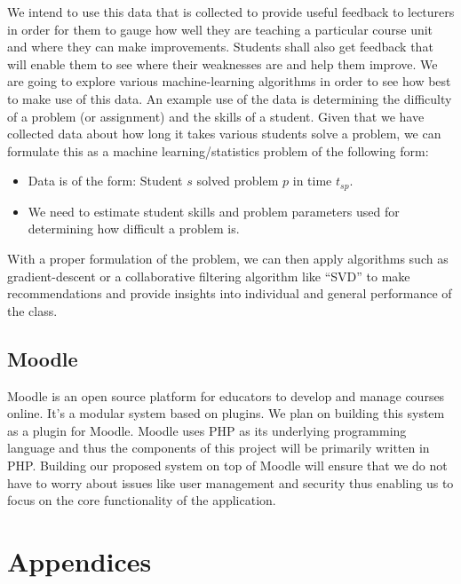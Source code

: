 \documentclass[12pt]{article}
\begin{document}
	We intend to use this data that is collected to provide useful feedback to lecturers in order for them to gauge how well they are teaching a particular course unit and where they can make improvements. Students shall also get feedback that will enable them to see where their weaknesses are and help	them improve. We are going to explore various machine-learning algorithms in order to see how best to make use of this data. An example use of the data is determining the difficulty of a problem (or assignment) and the skills of a student. Given that we have collected data about how long it takes various students solve a problem, we can formulate this as a machine learning/statistics problem of the following form:
	\begin{itemize}
		\item Data is of the form: Student $s$ solved problem $p$ in time $t_{sp}$.
		\item We need to estimate student skills and problem parameters used for determining how difficult a problem is. 
	\end{itemize}
	With a proper formulation of the problem, we can then apply algorithms such as gradient-descent \cite{gds} or a collaborative filtering algorithm like “SVD” \cite{kalman} to make recommendations and provide insights into individual and general performance of the class.
	\subsection{Moodle}
	Moodle\cite{moodle} is an open source platform for educators to develop and manage courses online. It's a modular system based on plugins. We plan on building this system as a plugin for Moodle. Moodle uses PHP as its underlying programming language and thus the components of this project will be primarily written in PHP. Building our proposed system on top of Moodle will ensure that we do not have to worry about issues like user management and security thus enabling us to focus on the core functionality of the application.

\newpage


\newpage
\section{Appendices}
\end{document}
